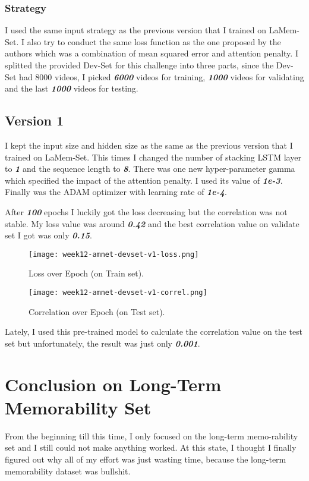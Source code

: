 \subsubsection{Strategy}
I used the same input strategy as the previous version that I trained on LaMem-Set. I also try to conduct the same loss function as the one proposed by the authors which was a combination of mean squared error and attention penalty. I splitted the provided Dev-Set for this challenge into three parts, since the Dev-Set had 8000 videos, I picked \textbf{\emph{6000}} videos for training, \textbf{\emph{1000}} videos for validating and the last \textbf{\emph{1000}} videos for testing.

\subsection{Version 1}
I kept the input size and hidden size as the same as the previous version that I trained on LaMem-Set. This times I changed the number of stacking LSTM layer to \textbf{\emph{1}} and the sequence length to \textbf{\emph{8}}. There was one new hyper-parameter gamma which specified the impact of the attention penalty. I used its value of \textbf{\emph{1e-3}}. Finally was the ADAM optimizer with learning rate of \textbf{\emph{1e-4}}.

After \textbf{\emph{100}} epochs I luckily got the loss decreasing but the correlation was not stable. My loss value was around \textbf{\emph{0.42}} and the best correlation value on validate set I got was only \textbf{\emph{0.15}}.

\begin{figure}[!ht]
\centering
\texttt{[image: week12-amnet-devset-v1-loss.png]}
\caption{Loss over Epoch (on Train set).}
\end{figure}

\newpage
\begin{figure}[!ht]
\centering
\texttt{[image: week12-amnet-devset-v1-correl.png]}
\caption{Correlation over Epoch (on Test set).}
\end{figure}

Lately, I used this pre-trained model to calculate the correlation value on the test set but unfortunately, the result was just only \textbf{\emph{0.001}}.


\section{Conclusion on Long-Term Memorability Set}
From the beginning till this time, I only focused on the long-term memo-rability set and I still could not make anything worked. At this state, I thought I finally figured out why all of my effort was just wasting time, because the long-term memorability dataset was bullshit.













